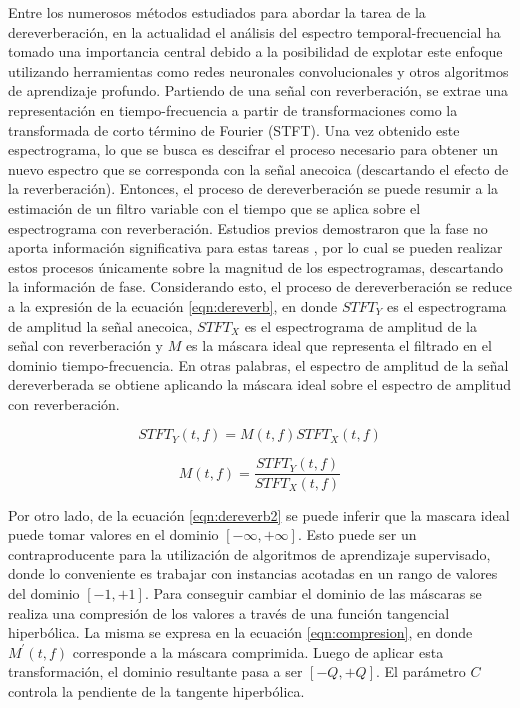 Entre los numerosos métodos estudiados para abordar la tarea de la dereverberación, en la actualidad el análisis del espectro temporal-frecuencial ha tomado una importancia central debido a la posibilidad de explotar este enfoque utilizando herramientas como redes neuronales convolucionales y otros algoritmos de aprendizaje profundo. Partiendo de una señal con reverberación, se extrae una representación en tiempo-frecuencia a partir de transformaciones como la transformada de corto término de Fourier (STFT). Una vez obtenido este espectrograma, lo que se busca es descifrar el proceso necesario para obtener un nuevo espectro que se corresponda con la señal anecoica (descartando el efecto de la reverberación). Entonces, el proceso de dereverberación se puede resumir a la estimación de un filtro variable con el tiempo que se aplica sobre el espectrograma con reverberación. Estudios previos demostraron que la fase no aporta información significativa para estas tareas \cite{fase1}\cite{fase2}, por lo cual se pueden realizar estos procesos únicamente sobre la magnitud de los espectrogramas, descartando la información de fase. Considerando esto, el proceso de dereverberación se reduce a la expresión de la ecuación \ref{eqn:dereverb}, en donde $STFT_{Y}$ es el espectrograma de amplitud la señal anecoica, $STFT_{X}$ es el espectrograma de amplitud de la señal con reverberación y $M$ es la máscara ideal que representa el filtrado en el dominio tiempo-frecuencia. En otras palabras, el espectro de amplitud de la señal dereverberada se obtiene aplicando la máscara ideal sobre el espectro de amplitud con reverberación. 
 
\begin{equation}
\label{eqn:dereverb}
	STFT_{Y}(t,f)= M(t,f) STFT_{X}(t,f) 
\end{equation}

\begin{equation}
\label{eqn:dereverb2}
	M(t,f) =  \frac{STFT_{Y}(t,f)}{STFT_{X}(t,f)} 
\end{equation}

Por otro lado, de la ecuación \ref{eqn:dereverb2} se puede inferir que la mascara ideal puede tomar valores en el dominio $[-\infty , +\infty]$. Esto puede ser un contraproducente para la utilización de algoritmos de aprendizaje supervisado, donde lo conveniente es trabajar con instancias acotadas en un rango de valores del dominio $[-1 , +1]$. Para conseguir cambiar el dominio de las máscaras se realiza una compresión de los valores a través de una función tangencial hiperbólica. La misma se expresa en la ecuación \ref{eqn:compresion}, en donde $M^{'}(t,f)$ corresponde a la máscara comprimida. Luego de aplicar esta transformación, el dominio resultante pasa a ser $[-Q , +Q]$. El parámetro $C$ controla la pendiente de la tangente hiperbólica. 

